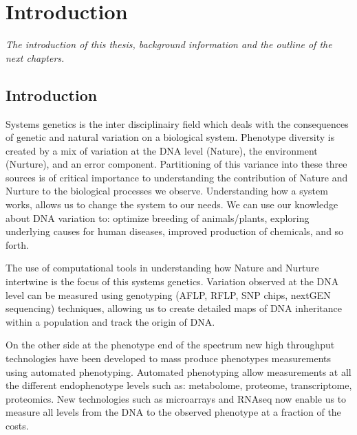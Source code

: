 \chapter{Introduction}
\emph{The introduction of this thesis, background information and the outline of the next chapters.}

\null
\vfill
\newpage

\section{Introduction}
Systems genetics is the inter disciplinairy field which deals with the consequences of genetic 
and natural variation on a biological system. Phenotype diversity is created by a mix of variation 
at the DNA level (Nature), the environment (Nurture), and an error component. Partitioning of this 
variance into these three sources is of critical importance to understanding the contribution of 
Nature and Nurture to the biological processes we observe. Understanding how a system works, allows 
us to change the system to our needs. We can use our knowledge about DNA variation to: optimize 
breeding of animals/plants, exploring underlying causes for human diseases, improved production 
of chemicals, and so forth.

The use of computational tools in understanding how Nature and Nurture intertwine is the 
focus of this systems genetics. Variation observed at the DNA level can be measured using 
genotyping (AFLP, RFLP, SNP chips, nextGEN sequencing) techniques, allowing us to create 
detailed maps of DNA inheritance within a population and track the origin of DNA. 

On the other side at the phenotype end of the spectrum new high throughput technologies 
have been developed to mass produce phenotypes measurements using automated phenotyping. 
Automated phenotyping allow measurements at all the different endophenotype levels such 
as: metabolome, proteome, transcriptome, proteomics. New technologies such as microarrays 
and RNAseq now enable us to measure all levels from the DNA to the observed phenotype at 
a fraction of the costs.

